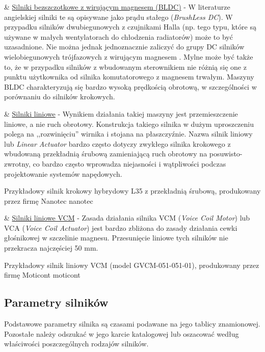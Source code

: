 \begin{easylist}
	& \underline{Silniki bezszczotkowe z wirującym magnesem (BLDC)} - W literaturze angielskiej silniki te są opisywane jako prądu stałego ({\em BrushLess DC}). W przypadku silników dwubiegunowych z czujnikami Halla (np. tego typu, które są używane w małych wentylatorach do chłodzenia radiatorów) może to być uzasadnione. Nie można jednak jednoznacznie zaliczyć do grupy DC silników wielobiegunowych trójfazowych z wirującym magnesem \cite{przepiorkowski}. Mylne może być także to, że w przypadku silników z wbudowanym sterownikiem nie różnią się one z punktu użytkownika od silnika komutatorowego z magnesem trwałym. Maszyny BLDC charakteryzują się bardzo wysoką prędkością obrotową, w szczególności w porównaniu do silników krokowych.	
	
	& \underline{Silniki liniowe} - Wynikiem działania takiej maszyny jest przemieszczenie liniowe, a nie ruch obrotowy. Konstrukcja takiego silnika w dużym uproszczeniu polega na ,,rozwinięciu'' wirnika i stojana na płaszczyźnie. Nazwa silnik liniowy lub {\em Linear Actuator} bardzo często dotyczy zwykłego silnika krokowego z wbudowaną przekładnią śrubową zamieniającą ruch obrotowy na posuwisto-zwrotny, co bardzo często wprowadza niejasności i wątpliwości podczas projektowanie systemów napędowych.
	
		{Przykładowy silnik krokowy hybrydowy L35 z przekładnią śrubową, produkowany przez firmę Nanotec}
		{nanotec}
	
	& \underline{Silniki liniowe VCM} - Zasada działania silnika VCM ({\em Voice Coil Motor}) lub VCA ({\em Voice Coil Actuator}) jest bardzo zbliżona do zasady działania cewki głośnikowej w szczelinie magnesu. Przesunięcie liniowe tych silników nie przekracza najczęściej 50 mm.		
	
\end{easylist} 

	{Przykładowy silnik liniowy VCM (model GVCM-051-051-01), produkowany przez firmę Moticont}
	{moticont}
	
\subsection{Parametry silników}

Podstawowe parametry silnika są czasami podawane na jego tablicy znamionowej. Pozostałe należy odszukać w jego karcie katalogowej lub oszacować według właściwości poszczególnych rodzajów silników.
\\


